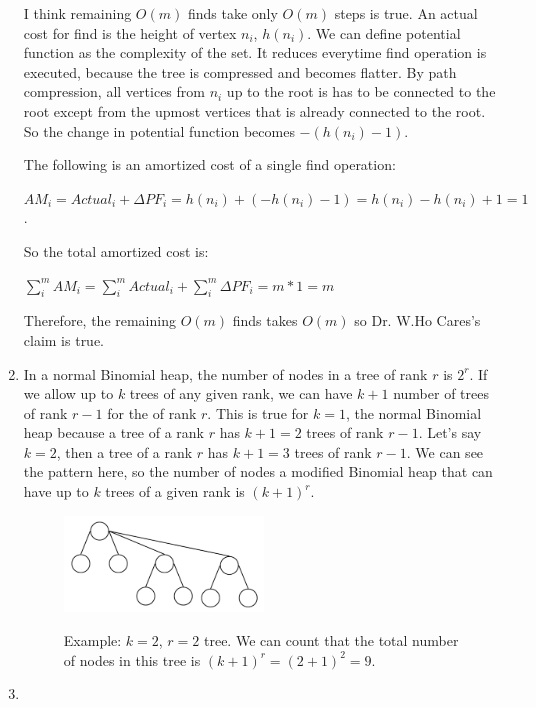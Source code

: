 \documentclass{article}
\begin{document}
\begin{enumerate}
  I think remaining $O(m)$ finds take only $O(m)$ steps is true.
  An actual cost for find is the height of vertex $n_i$, $h(n_i)$.
  We can define potential function as the complexity of the set.
  It reduces everytime find operation is executed, because the tree is compressed and becomes flatter.
  By path compression, all vertices from $n_i$ up to the root is has to be connected to the root except from the upmost vertices that is already connected to the root.
  So the change in potential function becomes $-(h(n_i)-1)$.

  The following is an amortized cost of a single find operation:

  $AM_i=Actual_i+\Delta PF_i=h(n_i)+(-h(n_i)-1)=h(n_i)-h(n_i)+1=1$.

  So the total amortized cost is:

  $\sum_{i}^{m} AM_i = \sum_{i}^{m} Actual_i+\sum_{i}^{m} \Delta PF_i=m*1=m$

  Therefore, the remaining $O(m)$ finds takes $O(m)$ so Dr. W.Ho Cares's claim is true.

  \item In a normal Binomial heap, the number of nodes in a tree of rank $r$ is $2^r$.
  If we allow up to $k$ trees of any given rank, we can have $k+1$ number of trees of rank $r-1$ for the of rank $r$.
  This is true for $k=1$, the normal Binomial heap because a tree of a rank $r$ has $k+1=2$ trees of rank $r-1$.
  Let's say $k=2$, then a tree of a rank $r$ has $k+1=3$ trees of rank $r-1$.
  We can see the pattern here, so the number of nodes a modified Binomial heap that can have up to $k$ trees of a given rank is $(k+1)^r$.

  \begin{figure}[H]
    \centering
    \includegraphics[width=0.5\textwidth]{image1.png}
    \begin{minipage}{0.5\textwidth}
        \centering
        Example: $k=2$, $r=2$ tree. We can count that the total number of nodes in this tree is $(k+1)^r=(2+1)^2=9.$
    \end{minipage}
  \end{figure}
  \item
\end{enumerate}
\end{document}
